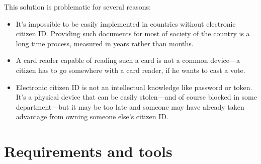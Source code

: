 \documentclass[a4paper,twoside,12pt]{book}
\begin{document}
    This solution is problematic for several reasons:
    \begin{itemize}
      \item It's impossible to be easily implemented in countries without electronic citizen ID. 
        Providing such documents for most of society of the country is a long time process, measured in years rather than months.
      \item A card reader capable of reading such a card is not a common device---a citizen has to go somewhere with a card reader, if he wants to cast a vote.
      \item Electronic citizen ID is not an intellectual knowledge like password or token. 
        It's a physical device that can be easily stolen---and of course blocked in some department---but it may be too late and someone may have already taken advantage from owning someone else's citizen ID.
    \end{itemize}

\chapter{Requirements and tools}
\end{document}
